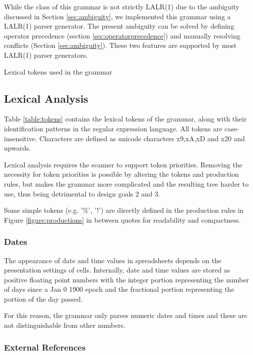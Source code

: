 \documentclass[conference]{IEEEtran}
\begin{document}
While the class of this grammar is not strictly LALR(1) due to the ambiguity discussed in Section \ref{sec:ambiguity}, we implemented this grammar using a LALR(1) parser generator.
The present ambiguity can be solved by defining operator precedence (section \ref{sec:operatorprecedence}) and manually resolving conflicts (Section \ref{sec:ambiguity}).
These two features are supported by most LALR(1) parser generators.
\begin{table}
\vspace{2mm}
\caption{Lexical tokens used in the grammar}
\label{table:tokens}
\centering

\end{table}

\subsection{Lexical Analysis}
Table \ref{table:tokens} contains the lexical tokens of the grammar, along with their identification patterns in the regular expression language. All tokens are case-insensitive.
Characters are defined as unicode characters x9,xA,xD and x20 and upwards.

Lexical analysis requires the scanner to support token priorities. Removing the necessity for token priorities is possible by altering the tokens and production rules, but makes the grammar more complicated and the resulting tree harder to use, thus being detrimental to design goals 2 and 3.

Some simple tokens (e.g. '\%', '!') are directly defined in the production rules in Figure \ref{figure:productions} in between quotes for readability and compactness.

\subsubsection{\textbf{Dates}}

The appearance of date and time values in spreadsheets depends on the presentation settings of cells. Internally, date and time values are stored as positive floating point numbers with the integer portion representing the number of days since a Jan 0 1900 epoch and the fractional portion representing the portion of the day passed.

For this reason, the grammar only parses numeric dates and times and these are not distinguishable from other numbers.

\subsubsection{\textbf{External References}}
\end{document}
